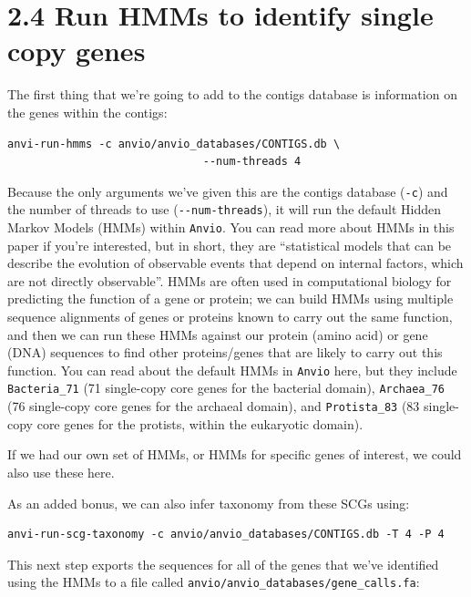 \documentclass[
]{book}
\begin{document}
\section{2.4 Run HMMs to identify single copy genes}\label{run-hmms-to-identify-single-copy-genes}

The first thing that we're going to add to the contigs database is information on the genes within the contigs:

\begin{verbatim}
anvi-run-hmms -c anvio/anvio_databases/CONTIGS.db \
                              --num-threads 4
\end{verbatim}

Because the only arguments we've given this are the contigs database (\texttt{-c}) and the number of threads to use (\texttt{-\/-num-threads}), it will run the default Hidden Markov Models (HMMs) within \texttt{Anvi\textquotesingle{}o}. You can read more about HMMs in this paper if you're interested, but in short, they are ``statistical models that can be describe the evolution of observable events that depend on internal factors, which are not directly observable''. HMMs are often used in computational biology for predicting the function of a gene or protein; we can build HMMs using multiple sequence alignments of genes or proteins known to carry out the same function, and then we can run these HMMs against our protein (amino acid) or gene (DNA) sequences to find other proteins/genes that are likely to carry out this function. You can read about the default HMMs in \texttt{Anvi\textquotesingle{}o} here, but they include \texttt{Bacteria\_71} (71 single-copy core genes for the bacterial domain), \texttt{Archaea\_76} (76 single-copy core genes for the archaeal domain), and \texttt{Protista\_83} (83 single-copy core genes for the protists, within the eukaryotic domain).

If we had our own set of HMMs, or HMMs for specific genes of interest, we could also use these here.

As an added bonus, we can also infer taxonomy from these SCGs using:

\begin{verbatim}
anvi-run-scg-taxonomy -c anvio/anvio_databases/CONTIGS.db -T 4 -P 4
\end{verbatim}

This next step exports the sequences for all of the genes that we've identified using the HMMs to a file called \texttt{anvio/anvio\_databases/gene\_calls.fa}:
\end{document}

